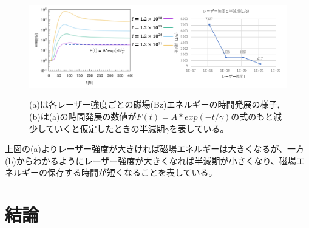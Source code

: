 \documentclass[a4paper,11pt,titlepage]{jarticle}
\numberwithin{equation}{section} %
\begin{document}
  \begin{figure}[H]
    \begin{center}
      \includegraphics[scale=0.9]{./image/4-25-10rod.png}
      \label{fig:4-4-17}
      \caption{(a)は各レーザー強度ごとの磁場(Bz)エネルギーの時間発展の様子,(b)は(a)の時間発展の数値が$F(t)= A* exp(-t / \gamma)$の式のもと減少していくと仮定したときの半減期$\gamma$を表している。}
    \end{center}
  \end{figure}
  
  上図の(a)よりレーザー強度が大きければ磁場エネルギーは大きくなるが、一方(b)からわかるようにレーザー強度が大きくなれば半減期が小さくなり、磁場エネルギーの保存する時間が短くなることを表している。
  



\section{結論}
\end{document}

